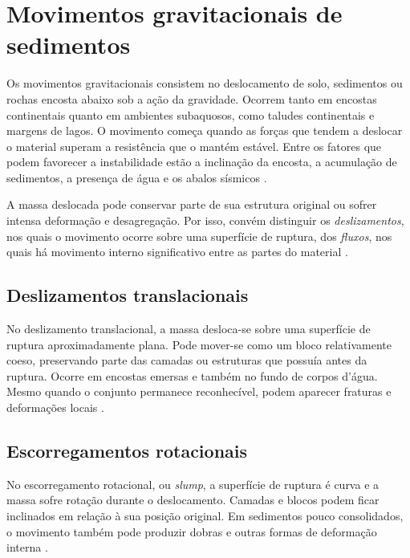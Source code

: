 \documentclass[a4paper,12pt]{article}
\theoremstyle{definition}
\theoremstyle{definition}
\theoremstyle{definition}
\begin{document}
\section{Movimentos gravitacionais de sedimentos}

Os movimentos gravitacionais consistem no deslocamento de solo,
sedimentos ou rochas encosta abaixo sob a ação da gravidade. Ocorrem
tanto em encostas continentais quanto em ambientes subaquosos, como
taludes continentais e margens de lagos. O movimento começa quando as
forças que tendem a deslocar o material superam a resistência que o
mantém estável. Entre os fatores que podem favorecer a instabilidade
estão a inclinação da encosta, a acumulação de sedimentos, a presença
de água e os abalos sísmicos
\autocite{usgs2004landslide,hampton1996submarine}.

A massa deslocada pode conservar parte de sua estrutura original ou
sofrer intensa deformação e desagregação. Por isso, convém distinguir
os \emph{deslizamentos}, nos quais o movimento ocorre sobre uma
superfície de ruptura, dos \emph{fluxos}, nos quais há movimento
interno significativo entre as partes do material
\autocite{usgs2004landslide,iverson2003gravity}.

\subsection{Deslizamentos translacionais}

No deslizamento translacional, a massa desloca-se sobre uma superfície
de ruptura aproximadamente plana. Pode mover-se como um bloco
relativamente coeso, preservando parte das camadas ou estruturas que
possuía antes da ruptura. Ocorre em encostas emersas e também no
fundo de corpos d'água. Mesmo quando o conjunto permanece
reconhecível, podem aparecer fraturas e deformações locais
\autocite{usgs2004landslide,hampton1996submarine}.

\subsection{Escorregamentos rotacionais}

No escorregamento rotacional, ou \textit{slump}, a superfície de
ruptura é curva e a massa sofre rotação durante o deslocamento.
Camadas e blocos podem ficar inclinados em relação à sua posição
original. Em sedimentos pouco consolidados, o movimento também pode
produzir dobras e outras formas de deformação interna
\autocite{usgs2004landslide,hampton1996submarine}.
\end{document}
